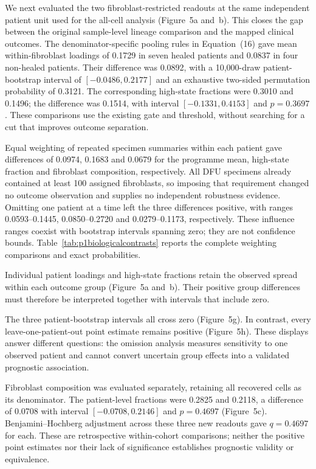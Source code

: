 \documentclass[10pt,a4paper]{article}
\begin{document}
We next evaluated the two fibroblast-restricted readouts at the same independent patient unit used for the all-cell analysis (Figure~5a and~b). This closes the gap between the original sample-level lineage comparison and the mapped clinical outcomes. The denominator-specific pooling rules in Equation~(16) gave mean within-fibroblast loadings of 0.1729 in seven healed patients and 0.0837 in four non-healed patients. Their difference was 0.0892, with a 10,000-draw patient-bootstrap interval of $[-0.0486,0.2177]$ and an exhaustive two-sided permutation probability of 0.3121. The corresponding high-state fractions were 0.3010 and 0.1496; the difference was 0.1514, with interval $[-0.1331,0.4153]$ and $p=0.3697$. These comparisons use the existing gate and threshold, without searching for a cut that improves outcome separation.

Equal weighting of repeated specimen summaries within each patient gave differences of 0.0974, 0.1683 and 0.0679 for the programme mean, high-state fraction and fibroblast composition, respectively. All DFU specimens already contained at least 100 assigned fibroblasts, so imposing that requirement changed no outcome observation and supplies no independent robustness evidence. Omitting one patient at a time left the three differences positive, with ranges 0.0593--0.1445, 0.0850--0.2720 and 0.0279--0.1173, respectively. These influence ranges coexist with bootstrap intervals spanning zero; they are not confidence bounds. Table~\ref{tab:p1biologicalcontrasts} reports the complete weighting comparisons and exact probabilities.

Individual patient loadings and high-state fractions retain the observed spread within each outcome group (Figure~5a and~b). Their positive group differences must therefore be interpreted together with intervals that include zero.

The three patient-bootstrap intervals all cross zero (Figure~5g). In contrast, every leave-one-patient-out point estimate remains positive (Figure~5h). These displays answer different questions: the omission analysis measures sensitivity to one observed patient and cannot convert uncertain group effects into a validated prognostic association.

Fibroblast composition was evaluated separately, retaining all recovered cells as its denominator. The patient-level fractions were 0.2825 and 0.2118, a difference of 0.0708 with interval $[-0.0708,0.2146]$ and $p=0.4697$ (Figure~5c). Benjamini--Hochberg adjustment across these three new readouts gave $q=0.4697$ for each. These are retrospective within-cohort comparisons; neither the positive point estimates nor their lack of significance establishes prognostic validity or equivalence.
\end{document}
